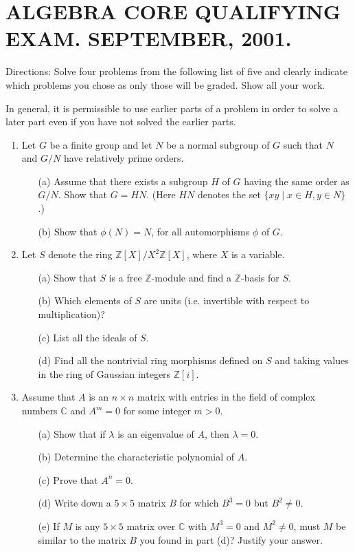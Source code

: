 \documentclass{article}
\begin{document}
\section*{ALGEBRA CORE QUALIFYING EXAM. SEPTEMBER, 2001.}

Directions: Solve four problems from the following list of five and clearly indicate which problems you chose as only those will be graded. Show all your work.

In general, it is permissible to use earlier parts of a problem in order to solve a later part even if you have not solved the earlier parts.

\begin{enumerate}
    \item Let \(G\) be a finite group and let \(N\) be a normal subgroup of \(G\) such that \(N\) and \(G/N\) have relatively prime orders.
    \begin{itemize}
        \item[(a)] Assume that there exists a subgroup \(H\) of \(G\) having the same order as \(G/N\). Show that \(G=HN\). (Here \(HN\) denotes the set \(\{xy \mid x \in H, y \in N\}\).)
        \item[(b)] Show that \(\phi(N)=N\), for all automorphisms \(\phi\) of \(G\).
    \end{itemize}

    \item Let \(S\) denote the ring \(\mathbb{Z}[X]/X^2\mathbb{Z}[X]\), where \(X\) is a variable.
    \begin{itemize}
        \item[(a)] Show that \(S\) is a free \(\mathbb{Z}\)-module and find a \(\mathbb{Z}\)-basis for \(S\).
        \item[(b)] Which elements of \(S\) are units (i.e. invertible with respect to multiplication)?
        \item[(c)] List all the ideals of \(S\).
        \item[(d)] Find all the nontrivial ring morphisms defined on \(S\) and taking values in the ring of Gaussian integers \(\mathbb{Z}[i]\).
    \end{itemize}

    \item Assume that \(A\) is an \(n \times n\) matrix with entries in the field of complex numbers \(\mathbb{C}\) and \(A^m=0\) for some integer \(m>0\).
    \begin{itemize}
        \item[(a)] Show that if \(\lambda\) is an eigenvalue of \(A\), then \(\lambda=0\).
        \item[(b)] Determine the characteristic polynomial of \(A\).
        \item[(c)] Prove that \(A^n=0\).
        \item[(d)] Write down a \(5 \times 5\) matrix \(B\) for which \(B^3=0\) but \(B^2 \neq 0\).
        \item[(e)] If \(M\) is any \(5 \times 5\) matrix over \(\mathbb{C}\) with \(M^3=0\) and \(M^2 \neq 0\), must \(M\) be similar to the matrix \(B\) you found in part (d)? Justify your answer.
    \end{itemize}


\end{enumerate}
\end{document}
